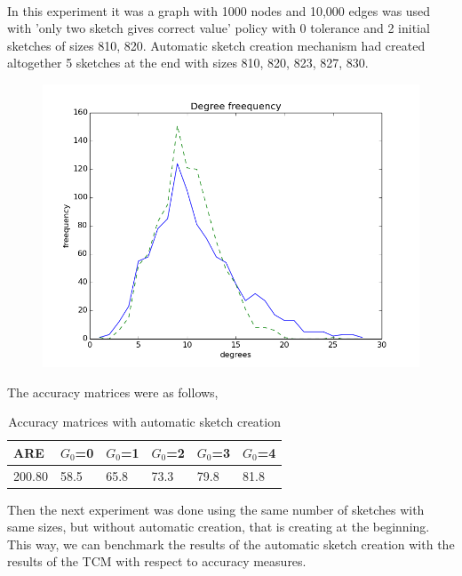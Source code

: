 \documentclass[12pt]{report}
\numberwithin{figure}{section}
\numberwithin{table}{section}
\begin{document}
\paragraph{}

In this experiment it was a graph with 1000 nodes and 10,000 edges was used with 'only two sketch gives correct value' policy with 0 tolerance and 2 initial sketches of sizes 810, 820. Automatic sketch creation mechanism had created altogether 5 sketches at the end with sizes 810, 820, 823, 827, 830.

\begin{figure}[H]
\centering
\includegraphics[scale=0.6]{images/AS-2init-2scale-0t-n1000-e10000-sketches-811-821-823-827-829plot}
\end{figure}

The accuracy matrices were as follows, 

\begin{table}[H]
\centering
\begin{tabular}{|l|l|l|l|l|l|}
\hline
 ARE   & $G_0$=0 & $G_0$=1 & $G_0$=2 &  $G_0$=3 & $G_0$=4 \\ \hline
200.80 &   58.5  &  65.8   &   73.3  &   79.8   &   81.8 \\ \hline
\end{tabular}
\caption{Accuracy matrices with automatic sketch creation}
\end{table}

Then the next experiment was done using the same number of sketches with same sizes, but without automatic creation, that is creating at the beginning. This way, we can benchmark the results of the automatic sketch creation with the results of the TCM with respect to accuracy measures. 
\end{document}
